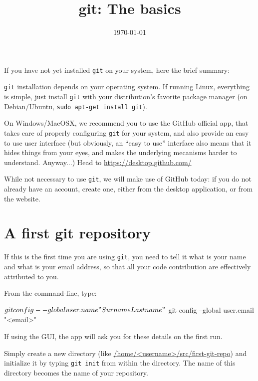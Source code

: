 \documentclass{instructions}
\title{git: The basics}
\date{\today}
\newcommand{\git}{\texttt{git}\xspace}
\begin{document}
\maketitle

\intro

If you have not yet installed \git on your system, here the brief
summary:

\git installation depends on your operating system. If running Linux,
everything is simple, just install \git with your distribution's
favorite package manager (on Debian/Ubuntu,
\texttt{sudo apt-get install git}).

On Windows/MacOSX, we recommend you to use the GitHub official app, that takes
care of properly configuring \git for your system, and also provide an
easy to use user interface (but obviously, an ``easy to use'' interface also means
that it hides things from your eyes, and makes the underlying mecanisms harder to
understand. Anyway...) Head to \url{https://desktop.github.com/}


While not necessary to use \git, we will make use of GitHub today: if you do not
already have an account, create one, either from the desktop application, or
from the website.

\part{A first git repository}


If this is the first time you are using \git, you need to tell it what is your
name and what is your email address, so that all your code contribution are
effectively attributed to you.

From the command-line, type:


\begin{shcode}
$ git config --global user.name "Surname Lastname"
$ git config --global user.email "<email>"
\end{shcode}

If using the GUI, the app will ask you for these details on the first run.


Simply create a new directory (like \url{/home/<username>/src/first-git-repo}) and initialize
it by typing \texttt{git init} from within the directory. The name of this
directory becomes the name of your repository.
\end{document}
